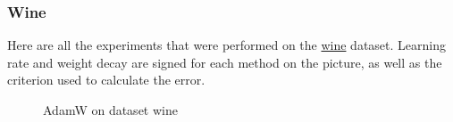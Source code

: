 \documentclass{article}
\begin{document}
\subsubsection{Wine}
Here are all the experiments that were performed on the \href{https://archive.ics.uci.edu/ml/datasets/wine}{wine} dataset. Learning rate and weight decay are signed for each method on the picture, as well as the criterion used to calculate the error.
\begin{figure}[H]
\begin{minipage}[h]{0.5\linewidth}
\end{minipage}
\hfill
\begin{minipage}[h]{0.5\linewidth}
\end{minipage}
\caption{AdamW on dataset wine}

\label{fig:w_adamw}
\end{figure}
\end{document}
